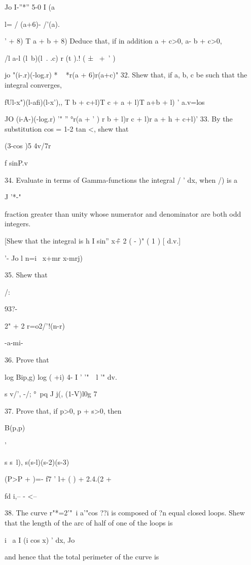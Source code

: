 Jo I-''*'' 5-0 I (a

l= / (a+6)- /'(a).

' + 8) T a + b + 8) Deduce that, if in addition a + c>0, a- b + c>0,

/l a-l (l\ b)(l\ . .c) r (t ).! ( ± \ +\ ' )

jo "(i-.r)(-log.r) * ~ *r(a + 6)r(a+c)" 32. Shew that, if a, b, c be
such that the integral converges,

fUl-x")(l-afi)(l-x'),, T b + c+l)T c + a + l)T a+b + l) ' a.v=los

JO (i-A-)(-log.r) '" '' °r(a + ' ) r b + l)r c + l)r a + h + c+l)' 33.
By the substitution cos = 1-2 tan <, shew that

(3-cos )5 4v/7r


f sinP.v

34. Evaluate in terms of Gamma-functions the integral / ' dx, when /)
is a

J '*-"

fraction greater than unity whose numerator and denominator are both
odd integers.

[Shew that the integral is h I sin'' x\~+ 2 ( - )" ( 1 ) [ d.v.]

'- Jo l n=i \ x+mr x-mrj)

35. Shew that


/:

93?-

2" + 2 r=o2/'!(n-r)

-a-mi-

36. Prove that

log Bip,g) log ( +i) 4- I ' \: '"\ \ l '" dv. 

s v/', -/; °\ pq J j(, (1-V)l0g 7

37. Prove that, if p>0, p + s>0, then

B(p,p)

 '

s s~l), s(s-l)(s-2)(s-3)

 (P>P + )=- f7 ' l+ ( ) + 2.4.(2 +

fd i,-- - <--

38. The curve r"*=2'"~i a'"cos ??i is composed of ?n equal closed
loops. Shew that the length of the arc of half of one of the loops is

i~ a I (i cos x) ' dx, Jo

and hence that the total perimeter of the curve is

